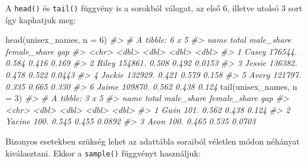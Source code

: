 \documentclass[
]{book}
\newenvironment{Shaded}{\begin{snugshade}}{\end{snugshade}}
\newcommand{\AttributeTok}[1]{\textcolor[rgb]{0.77,0.63,0.00}{#1}}
\newcommand{\CommentTok}[1]{\textcolor[rgb]{0.56,0.35,0.01}{\textit{#1}}}
\newcommand{\DecValTok}[1]{\textcolor[rgb]{0.00,0.00,0.81}{#1}}
\newcommand{\FunctionTok}[1]{\textcolor[rgb]{0.00,0.00,0.00}{#1}}
\newcommand{\NormalTok}[1]{#1}
\begin{document}
A \texttt{head()} és \texttt{tail()} függvény is a sorokból válogat, az első 6, illetve utolsó 3 sort így kaphatjuk meg:

\begin{Shaded}
\begin{Highlighting}[]
\FunctionTok{head}\NormalTok{(unisex\_names, }\AttributeTok{n =} \DecValTok{6}\NormalTok{)}
\CommentTok{\#\textgreater{} \# A tibble: 6 x 5}
\CommentTok{\#\textgreater{}   name     total male\_share female\_share    gap}
\CommentTok{\#\textgreater{}   \textless{}chr\textgreater{}    \textless{}dbl\textgreater{}      \textless{}dbl\textgreater{}        \textless{}dbl\textgreater{}  \textless{}dbl\textgreater{}}
\CommentTok{\#\textgreater{} 1 Casey  176544.      0.584        0.416 0.169 }
\CommentTok{\#\textgreater{} 2 Riley  154861.      0.508        0.492 0.0153}
\CommentTok{\#\textgreater{} 3 Jessie 136382.      0.478        0.522 0.0443}
\CommentTok{\#\textgreater{} 4 Jackie 132929.      0.421        0.579 0.158 }
\CommentTok{\#\textgreater{} 5 Avery  121797.      0.335        0.665 0.330 }
\CommentTok{\#\textgreater{} 6 Jaime  109870.      0.562        0.438 0.124}
\FunctionTok{tail}\NormalTok{(unisex\_names, }\AttributeTok{n =} \DecValTok{3}\NormalTok{)}
\CommentTok{\#\textgreater{} \# A tibble: 3 x 5}
\CommentTok{\#\textgreater{}   name   total male\_share female\_share    gap}
\CommentTok{\#\textgreater{}   \textless{}chr\textgreater{}  \textless{}dbl\textgreater{}      \textless{}dbl\textgreater{}        \textless{}dbl\textgreater{}  \textless{}dbl\textgreater{}}
\CommentTok{\#\textgreater{} 1 Gwin    101.      0.562        0.438 0.124 }
\CommentTok{\#\textgreater{} 2 Yacine  100.      0.545        0.455 0.0892}
\CommentTok{\#\textgreater{} 3 Aeon    100.      0.465        0.535 0.0703}
\end{Highlighting}
\end{Shaded}

Bizonyos esetekben szükség lehet az adattábla soraiból véletlen módon néhányat kiválasztani. Ekkor a \texttt{sample()} függvényt használjuk:
\end{document}
